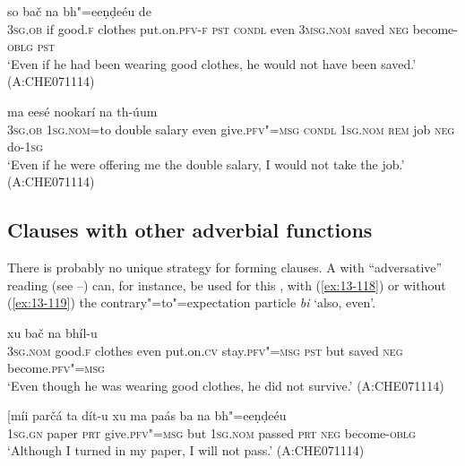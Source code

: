 \begin{exe}
\ex
\label{ex:13-116}
 so bač na bh"=eeṇḍeéu de  \\
\textsc{3sg.ob} if good.\textsc{f} clothes put.on.\textsc{pfv-f} \textsc{pst} \textsc{condl}  even \textsc{3msg.nom} saved \textsc{neg} become-\textsc{oblg} \textsc{pst} \\
\glt `Even if he had been wearing good clothes, he would not have been saved.' (A:CHE071114)

\ex
\label{ex:13-117}
\gll [tíi máa=the ḍábal tanxaá bi dít-u  heentá] ma eesé nookarí na th-úum \\
\textsc{3sg.ob} \textsc{1sg.nom}=to double salary even give.\textsc{pfv"=msg}  \textsc{condl } \textsc{1sg.nom} \textsc{rem} job \textsc{neg} do-\textsc{1sg} \\
\glt `Even if he were offering me the double salary, I would not take the job.' (A:CHE071114)
\end{exe}

\subsection{Clauses with other adverbial functions}
\label{subsec:13-4-5}

 There is probably no unique strategy for forming  clauses. A  with ``adversative'' reading (see --) can, for instance, be used for this , with (\ref{ex:13-118}) or without (\ref{ex:13-119}) the contrary"=to"=expectation particle \textit{bi} `also, even'. 

\begin{exe}
\ex
\label{ex:13-118}
 xu bač na bhíl-u  \\
\textsc{3sg.nom} good.\textsc{f} clothes even put.on.\textsc{cv}  stay.\textsc{pfv"=msg } \textsc{pst} but saved \textsc{neg} become.\textsc{pfv"=msg} \\
\glt `Even though he was wearing good clothes, he did not survive.' (A:CHE071114)

\ex
\label{ex:13-119}
\gll [míi parčá ta dít-u xu ma paás  ba na bh"=eeṇḍeéu \\
\textsc{1sg.gn} paper \textsc{prt} give.\textsc{pfv"=msg} but \textsc{1sg.nom} passed \textsc{prt} \textsc{neg} become-\textsc{oblg} \\
\glt `Although I turned in my paper, I will not pass.' (A:CHE071114) 
\end{exe}

